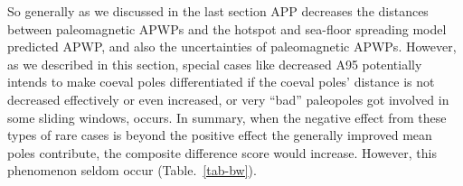 So generally as we discussed in the last section APP decreases the distances
between paleomagnetic APWPs and the hotspot and sea-floor spreading model
predicted APWP, and also the uncertainties of paleomagnetic APWPs. However, as
we described in this section, special cases like decreased A95 potentially
intends to make coeval poles differentiated if the coeval poles' distance is
not decreased effectively or even increased, or very ``bad'' paleopoles got
involved in some sliding windows, occurs. In summary, when the negative effect
from these types of rare cases is beyond the positive effect the generally
improved mean poles contribute, the composite difference score would increase.
However, this phenomenon seldom occur (Table.~\ref{tab-bw}).

\begin{table*}
\centering
\caption{One example of the Type 1 rare cases where AMP gives better similarity
  result than APP does from North America (101). Only statistically significant
  values are listed here.}
\label{tab-w3p4vs5}
\end{table*}
